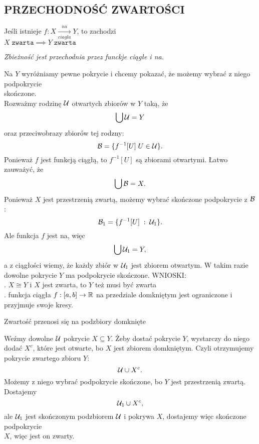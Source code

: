 \subsection{PRZECHODNOŚĆ ZWARTOŚCI}
\begin{center}\large
    Jeśli istnieje $f:X\xrightarrow[ciagla]{na} Y$, to zachodzi\smallskip\\
    $X\;\texttt{zwarta}\implies Y\;\texttt{zwarta}$\bigskip

    \emph{\normalsize{\color{def}Zbieżność jest przechodnia przez funckje ciągłe i na}.}
\end{center}
\dowod
Na $Y$ wyróżniamy pewne pokrycie i chcemy pokazać, że możemy wybrać z niego podpokrycie \\skończone.\medskip\\
Rozważmy rodzinę $\mathcal{U}$ otwartych zbiorów w $Y$ taką, że
$$\bigcup\mathcal{U}=Y$$
oraz przeciwobrazy zbiorów tej rodzny:
$$\mathcal{B}=\{f^{-1}[U]\;U\in\mathcal{U}\}.$$
Ponieważ $f$ jest funkcją ciągłą, to $f^{-1}[U]$ są zbiorami otwartymi. Łatwo zauważyć, że
$$\bigcup \mathcal{B}=X.$$
Ponieważ $X$ jest przestrzenią zwartą, możemy wybrać skończone podpokrycie z $\mathcal{B}$: 
$$\mathcal{B}_1=\{f^{-1}[U]\;:\;\mathcal{U}_1\}.$$
Ale funkcja $f$ jest na, więc
$$\bigcup\mathcal{U}_1=Y,$$
a z ciągłości wiemy, że każdy zbiór w $\mathcal{U}_1$ jest zbiorem otwartym. W takim razie dowolne pokrycie $Y$ ma podpokrycie skończone.
\kondow
{\large\color{acc}WNIOSKI:}\medskip\\
. $X\cong Y$ i $X$ jest zwarta, to $Y$ też musi być zwarta\smallskip\\
. funkcja ciągła $f:[a,b]\to \mathbb{R}$ na przedziale domkniętym jest ograniczone i przyjmuje swoje kresy.\bigskip\\
\bigskip

\begin{center}\large
    Zwartość przenosi się na podzbiory domknięte
\end{center}\bigskip
\dowod
Weźmy dowolne $\mathcal{U}$ pokrycie $X\subseteq Y$. Żeby dostać pokrycie $Y$, wystarczy do niego dodać $X^c$, które jest otwarte, bo $X$ jest zbiorem domkniętym. Czyli otrzymujemy pokrycie zwartego zbioru $Y$:
$$\mathcal{U}\cup X^c.$$
Możemy z niego wybrać podpokrycie skończone, bo $Y$ jest przestrzenią zwartą. Dostajemy
$$\mathcal{U}_1\cup X^c,$$
ale $\mathcal{U}_1$ jest skończonym podzbiorem $\mathcal{U}$ i pokrywa $X$, dostajemy więc skończone podpokrycie \\$X$, więc jest on zwarty.
\kondow

